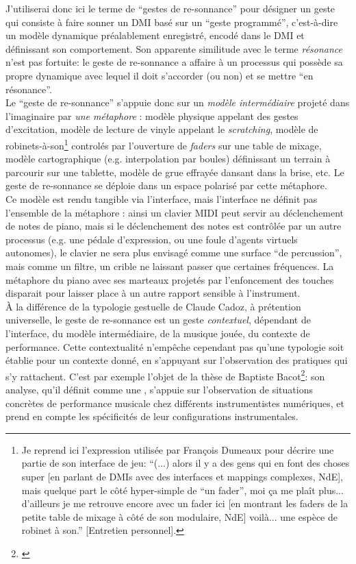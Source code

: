 \noindent J'utiliserai donc ici le terme de ``gestes de re-sonnance'' pour désigner un geste qui consiste à faire sonner un \gls{DMI} basé sur un ``geste programmé'', c'est-à-dire un modèle dynamique préalablement enregistré, encodé dans le \gls{DMI} et définissant son comportement. Son apparente similitude avec le terme \textit{résonance} n'est pas fortuite: le geste de re-sonnance a affaire à un processus qui possède sa propre dynamique avec lequel il doit s'accorder (ou non) et se mettre ``en résonance''.\\
\indent Le ``geste de re-sonnance'' s'appuie donc sur un \textit{modèle intermédiaire} projeté dans l'imaginaire par \textit{une métaphore} : modèle physique appelant des gestes d'excitation, modèle de lecture de vinyle appelant le \textit{scratching}, modèle de robinets-à-son\footnote{Je reprend ici l'expression utilisée par François Dumeaux pour décrire une partie de son interface de jeu: ``(...) alors il y a des gens qui en font des choses super [en parlant de \glspl{DMI} avec des interfaces et mappings complexes, NdE], mais quelque part le côté hyper-simple de ``un fader'', moi ça me plaît plus... d'ailleurs je me retrouve encore avec un fader ici [en montrant les faders de la petite table de mixage à côté de son modulaire, NdE] voilà... une espèce de robinet à son.'' [Entretien personnel].} controlés par l'ouverture de \textit{faders} sur une table de mixage, modèle cartographique (e.g. interpolation par boules) définissant un terrain à parcourir sur une tablette, modèle de grue effrayée dansant dans la brise, etc. Le geste de re-sonnance se déploie dans un espace polarisé par cette métaphore.\\
\indent Ce modèle est rendu tangible via l'interface, mais l'interface ne définit pas l'ensemble de la métaphore : ainsi un clavier \gls{MIDI} peut servir au déclenchement de notes de piano, mais si le déclenchement des notes est contrôlée par un autre processus (e.g. une pédale d'expression, ou une foule d'agents virtuels autonomes), le clavier ne sera plus envisagé comme une surface ``de percussion'', mais comme un filtre, un crible ne laissant passer que certaines fréquences. La métaphore du piano avec ses marteaux projetés par l'enfoncement des touches disparait pour laisser place à un autre rapport sensible à l'instrument.\\
\indent À la différence de la typologie gestuelle de Claude Cadoz, à prétention universelle, le geste de re-sonnance est un geste \textit{contextuel}, dépendant de l'interface, du modèle intermédiaire, de la musique jouée, du contexte de performance. Cette contextualité n'empêche cependant pas qu'une typologie soit établie pour un contexte donné, en s'appuyant sur l'observation des pratiques qui s'y rattachent. C'est par exemple l'objet de la thèse de Baptiste Bacot\footnote{\cite{bacot_geste_2017}}: son analyse, qu'il définit comme une , s'appuie sur l'observation de situations concrètes de performance musicale chez différents instrumentistes numériques, et prend en compte les spécificités de leur configurations instrumentales.\\
